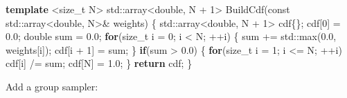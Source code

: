 \documentclass[
]{article}
\newenvironment{Shaded}{}{}
\newcommand{\AttributeTok}[1]{\textcolor[rgb]{0.49,0.56,0.16}{#1}}
\newcommand{\BuiltInTok}[1]{\textcolor[rgb]{0.00,0.50,0.00}{#1}}
\newcommand{\ControlFlowTok}[1]{\textcolor[rgb]{0.00,0.44,0.13}{\textbf{#1}}}
\newcommand{\DataTypeTok}[1]{\textcolor[rgb]{0.56,0.13,0.00}{#1}}
\newcommand{\DecValTok}[1]{\textcolor[rgb]{0.25,0.63,0.44}{#1}}
\newcommand{\FloatTok}[1]{\textcolor[rgb]{0.25,0.63,0.44}{#1}}
\newcommand{\KeywordTok}[1]{\textcolor[rgb]{0.00,0.44,0.13}{\textbf{#1}}}
\newcommand{\NormalTok}[1]{#1}
\newcommand{\OperatorTok}[1]{\textcolor[rgb]{0.40,0.40,0.40}{#1}}
\begin{document}
\begin{Shaded}
\begin{Highlighting}[]
\KeywordTok{template} \OperatorTok{\textless{}}\DataTypeTok{size\_t}\NormalTok{ N}\OperatorTok{\textgreater{}}
\BuiltInTok{std::}\NormalTok{array}\OperatorTok{\textless{}}\DataTypeTok{double}\OperatorTok{,}\NormalTok{ N }\OperatorTok{+} \DecValTok{1}\OperatorTok{\textgreater{}}\NormalTok{ BuildCdf}\OperatorTok{(}\AttributeTok{const} \BuiltInTok{std::}\NormalTok{array}\OperatorTok{\textless{}}\DataTypeTok{double}\OperatorTok{,}\NormalTok{ N}\OperatorTok{\textgreater{}\&}\NormalTok{ weights}\OperatorTok{)}
\OperatorTok{\{}
    \BuiltInTok{std::}\NormalTok{array}\OperatorTok{\textless{}}\DataTypeTok{double}\OperatorTok{,}\NormalTok{ N }\OperatorTok{+} \DecValTok{1}\OperatorTok{\textgreater{}}\NormalTok{ cdf}\OperatorTok{\{\};}
\NormalTok{    cdf}\OperatorTok{[}\DecValTok{0}\OperatorTok{]} \OperatorTok{=} \FloatTok{0.0}\OperatorTok{;}
    \DataTypeTok{double}\NormalTok{ sum }\OperatorTok{=} \FloatTok{0.0}\OperatorTok{;}
    \ControlFlowTok{for}\OperatorTok{(}\DataTypeTok{size\_t}\NormalTok{ i }\OperatorTok{=} \DecValTok{0}\OperatorTok{;}\NormalTok{ i }\OperatorTok{\textless{}}\NormalTok{ N}\OperatorTok{;} \OperatorTok{++}\NormalTok{i}\OperatorTok{)}
    \OperatorTok{\{}
\NormalTok{        sum }\OperatorTok{+=} \BuiltInTok{std::}\NormalTok{max}\OperatorTok{(}\FloatTok{0.0}\OperatorTok{,}\NormalTok{ weights}\OperatorTok{[}\NormalTok{i}\OperatorTok{]);}
\NormalTok{        cdf}\OperatorTok{[}\NormalTok{i }\OperatorTok{+} \DecValTok{1}\OperatorTok{]} \OperatorTok{=}\NormalTok{ sum}\OperatorTok{;}
    \OperatorTok{\}}
    \ControlFlowTok{if}\OperatorTok{(}\NormalTok{sum }\OperatorTok{\textgreater{}} \FloatTok{0.0}\OperatorTok{)}
    \OperatorTok{\{}
        \ControlFlowTok{for}\OperatorTok{(}\DataTypeTok{size\_t}\NormalTok{ i }\OperatorTok{=} \DecValTok{1}\OperatorTok{;}\NormalTok{ i }\OperatorTok{\textless{}=}\NormalTok{ N}\OperatorTok{;} \OperatorTok{++}\NormalTok{i}\OperatorTok{)}
\NormalTok{            cdf}\OperatorTok{[}\NormalTok{i}\OperatorTok{]} \OperatorTok{/=}\NormalTok{ sum}\OperatorTok{;}
\NormalTok{        cdf}\OperatorTok{[}\NormalTok{N}\OperatorTok{]} \OperatorTok{=} \FloatTok{1.0}\OperatorTok{;}
    \OperatorTok{\}}
    \ControlFlowTok{return}\NormalTok{ cdf}\OperatorTok{;}
\OperatorTok{\}}
\end{Highlighting}
\end{Shaded}

Add a group sampler:
\end{document}

